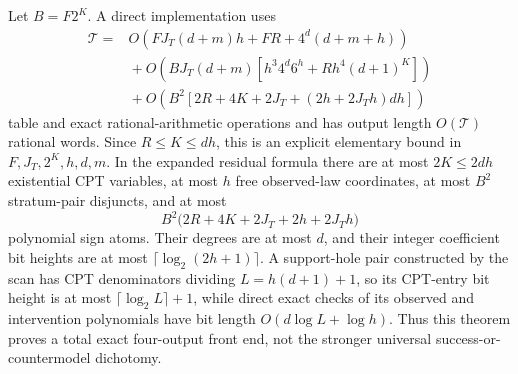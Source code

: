 Let \(B=F2^K\). A direct implementation uses
\[
 \begin{aligned}
 \mathcal T={}&O\!\left(FJ_T(d+m)h+FR+4^d(d+m+h)\right)\\
 &{}+O\!\left(BJ_T(d+m)\left[h^3 4^d6^h+Rh^4(d+1)^K\right]\right)\\
 &{}+O\!\left(B^2\left[2R+4K+2J_T+(2h+2J_Th)dh\right]\right)
 \end{aligned}
\]
table and exact rational-arithmetic operations and has output length \(O(\mathcal T)\) rational words. Since \(R\le K\le dh\), this is an explicit elementary bound in \(F,J_T,2^K,h,d,m\). In the expanded residual formula there are at most \(2K\le2dh\) existential CPT variables, at most \(h\) free observed-law coordinates, at most \(B^2\) stratum-pair disjuncts, and at most
\[
 B^2\bigl(2R+4K+2J_T+2h+2J_Th\bigr)
\]
polynomial sign atoms. Their degrees are at most \(d\), and their integer coefficient bit heights are at most \(\lceil\log_2(2h+1)\rceil\). A support-hole pair constructed by the scan has CPT denominators dividing \(L=h(d+1)+1\), so its CPT-entry bit height is at most \(\lceil\log_2 L\rceil+1\), while direct exact checks of its observed and intervention polynomials have bit length \(O(d\log L+\log h)\). Thus this theorem proves a total exact four-output front end, not the stronger universal success-or-countermodel dichotomy.